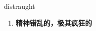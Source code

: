 
\begin{frame}
{\huge distraught}
\begin{center}
\begin{enumerate}\Large
  \item \textbf{精神错乱的，极其疯狂的}
\end{enumerate}
\end{center}
\end{frame}
